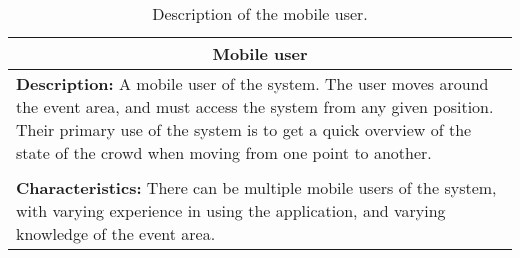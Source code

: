 \begin{table}[htbp]
    \centering
    \begin{tabularx}{/4}{X}
        \toprule
        \multicolumn{1}{c}{\textbf{Mobile user}} \\ 
        \midrule
        \textbf{Description:} A mobile user of the system. The user moves around the event area, and must access the system from any given position. Their primary use of the system is to get a quick overview of the state of the crowd when moving from one point to another. \\
        \\
        \textbf{Characteristics:} There can be multiple mobile users of the system, with varying experience in using the application, and varying knowledge of the event area. \\
        \bottomrule
    \end{tabularx}
    \caption{Description of the mobile user.}
    \label{tab:mob_user}
\end{table}